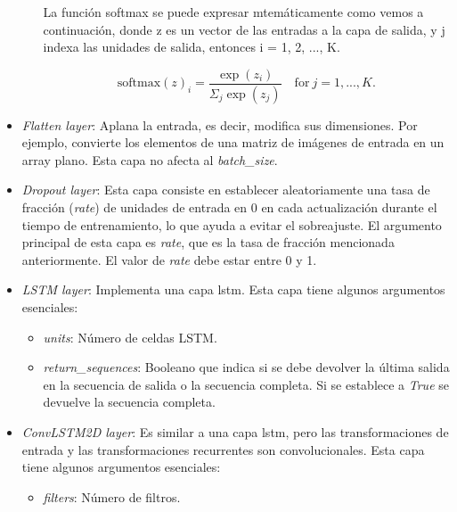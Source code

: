 \begin{itemize}
\begin{itemize}
            La función softmax se puede expresar mtemáticamente como vemos a continuación, donde z es un vector de las entradas a la capa de salida, y j indexa las unidades de salida, entonces i = 1, 2, ..., K.
            
            \begin{equation}\label{eq:SoftMax}
		        \mathrm{softmax}(z)_i=\frac{\exp(z_i)}{\Sigma_{j}{\exp(z_j)}} \quad \mathrm{for} \ j=1, ...,K.
            \end{equation}
        \end{itemize}
    
    \item \textit{Flatten layer}: Aplana la entrada, es decir, modifica sus dimensiones. Por ejemplo, convierte los elementos de una matriz de imágenes de entrada en un array plano. Esta capa no afecta al \textit{batch\_size}.
    
    \item \textit{Dropout layer}: Esta capa consiste en establecer aleatoriamente una tasa de fracción (\textit{rate}) de unidades de entrada en 0 en cada actualización durante el tiempo de entrenamiento, lo que ayuda a evitar el sobreajuste. El argumento principal de esta capa es \textit{rate}, que es la tasa de fracción mencionada anteriormente. El valor de \textit{rate} debe estar entre 0 y 1.

    
    \item \textit{LSTM layer}: Implementa una capa \acrfull{lstm}. Esta capa tiene algunos argumentos esenciales:
    
        \begin{itemize}
            \item \textit{units}: Número de celdas LSTM.
            
            \item \textit{return\_sequences}: Booleano que indica si se debe devolver la última salida en la secuencia de salida o la secuencia completa. Si se establece a \textit{True} se devuelve la secuencia completa.
        \end{itemize}
        
     \item \textit{ConvLSTM2D layer}: Es similar a una capa \acrfull{lstm}, pero las transformaciones de entrada y las transformaciones recurrentes son convolucionales. Esta capa tiene algunos argumentos esenciales:
    
        \begin{itemize}
             \item \textit{filters}: Número de filtros. 
            

\end{itemize}
\end{itemize}
